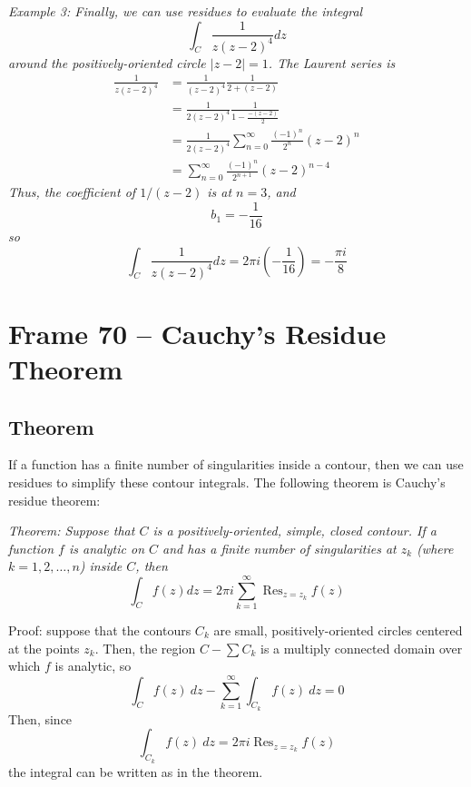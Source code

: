 \documentclass{article}
\DeclareMathOperator{\Res}{Res}
\begin{document}
\textit{Example 3: Finally, we can use residues to evaluate the integral
\[
	\int_C \frac{1}{z(z - 2)^4} dz
\]
around the positively-oriented circle $|z - 2| = 1$. The Laurent series is
\begin{align*}
	\frac{1}{z(z - 2)^4}
	&= \frac{1}{(z - 2)^4} \frac{1}{2 + (z - 2)} \\
	&= \frac{1}{2(z - 2)^4} \frac{1}{1 - \frac{-(z - 2)}{2}} \\
	&= \frac{1}{2(z - 2)^4} \sum_{n=0}^\infty \frac{(-1)^n}{2^n} (z - 2)^n \\
	&= \sum_{n=0}^\infty \frac{(-1)^n}{2^{n+1}} (z - 2)^{n-4}
\end{align*}
Thus, the coefficient of $1 / (z - 2)$ is at $n = 3$, and
\[
	b_1 = -\frac{1}{16}
\]
so
\[
	\int_C \frac{1}{z(z - 2)^4} dz = 2\pi i\left(-\frac{1}{16}\right) 
	= -\frac{\pi i}{8}
\]}


\clearpage
\section{Frame 70 -- Cauchy's Residue Theorem}
\subsection{Theorem}
If a function has a finite number of singularities inside a contour, then we can use residues to simplify these contour integrals. The following theorem is Cauchy's residue theorem:

\textit{Theorem: Suppose that $C$ is a positively-oriented, simple, closed contour. If a function $f$ is analytic on $C$ and has a finite number of singularities at $z_k$ (where $k = 1, 2, \dots, n$) inside $C$, then
\[
	\int_C f(z) dz = 2\pi i \sum_{k=1}^\infty \Res_{z = z_k} f(z)
\]}

Proof: suppose that the contours $C_k$ are small, positively-oriented circles centered at the points $z_k$. Then, the region $C - \sum C_k$ is a multiply connected domain over which $f$ is analytic, so
\[
	\int_C f(z)~dz - \sum_{k=1}^\infty \int_{C_k} f(z)~dz = 0
\]
Then, since
\[
	\int_{C_k} f(z)~dz = 2\pi i \Res_{z = z_k} f(z)
\]
the integral can be written as in the theorem.
\end{document}

